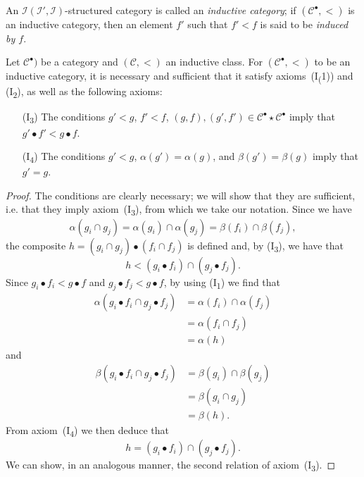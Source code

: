 \documentclass[a4paper,fleqn]{article}
\theoremstyle{plain}
\newenvironment{theorem}[1]
  {\renewcommand\theinnertheorem{#1}\innertheorem}
  {\endinnertheorem}
\theoremstyle{definition}
\newenvironment{definition}[1]
  {\renewcommand\theinnerdefinition{#1}\innerdefinition}
  {\endinnerdefinition}
\newcommand{\oldpage}[1]{{\marginpar{\footnotesize$\bigg\vert$\,\,\,\,\textit{p.~#1}}}}
\newcommand{\CC}{\mathcal{C}}
\newcommand{\II}{\mathcal{I}}
\begin{document}
\begin{definition}{21}
\label{definition:ii-21}
  An $\II(\II',\II)$-structured category is called an \emph{inductive category};
  if $(\CC^\bullet,<)$ is an inductive category, then an element $f'$ such that $f'<f$ is said to be \emph{induced by $f$}.
\end{definition}

\begin{theorem}{9}
\label{theorem:ii-9}
  Let $\CC^\bullet)$ be a category and $(\CC,<)$ an inductive class.
  For $(\CC^\bullet,<)$ to be an inductive category, it is necessary and sufficient that it satisfy axioms~(I\textsubscript(1)) and (I\textsubscript{2}), as well as the following axioms:
  \begin{enumerate}
    \item[\normalfont(I\textquotesingle\!\textsubscript{3})]
      The conditions $g'<g$, $f'<f$, $(g,f),(g',f')\in\CC^\bullet\star\CC^\bullet$ imply that $g'\bullet f'<g\bullet f$.
    \item[\normalfont(I\textquotesingle\!\textsubscript{4})]
      The conditions $g'<g$, $\alpha(g')=\alpha(g)$, and $\beta(g')=\beta(g)$ imply that $g'=g$.
  \end{enumerate}
\end{theorem}

\begin{proof}
  The conditions are clearly necessary; we will show that they are sufficient, i.e. that they imply axiom~(I\textsubscript{3}), from which we take our notation.
  Since we have
  \[
    \alpha(g_i\cap g_j)
    = \alpha(g_i)\cap\alpha(g_j)
    = \beta(f_i)\cap\beta(f_j),
  \]
  the composite $h=(g_i\cap g_j)\bullet(f_i\cap f_j)$ is defined and, by (I\textquotesingle\!\textsubscript{3}), we have that
  \[
    h < (g_i\bullet f_i)\cap(g_j\bullet f_j).
  \]
  Since $g_i\bullet f_i<g\bullet f$ and $g_j\bullet f_j<g\bullet f$, by using (I\textsubscript{1}) we find that
  \[
    \begin{aligned}
      \alpha(g_i\bullet f_i\cap g_j\bullet f_j)
      &= \alpha(f_i)\cap\alpha(f_j)
    \\&= \alpha(f_i\cap f_j)
    \\&= \alpha(h)
    \end{aligned}
  \]
  and
  \[
    \begin{aligned}
      \beta(g_i\bullet f_i\cap g_j\bullet f_j)
      &= \beta(g_i)\cap\beta(g_j)
    \\&= \beta(g_i\cap g_j)
    \\&= \beta(h).
    \end{aligned}
  \]
  \oldpage{406}
  From axiom~(I\textquotesingle\!\textsubscript{4}) we then deduce that
  \[
    h
    = (g_i\bullet f_i)\cap(g_j\bullet f_j).
  \]
  We can show, in an analogous manner, the second relation of axiom~(I\textquotesingle\!\textsubscript{3}).
\end{proof}
\end{document}
